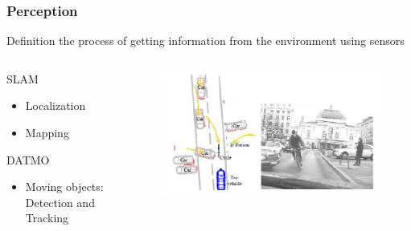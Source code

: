 \documentclass{beamer}
\begin{document}
	\begin{frame}
		\frametitle{Perception}
	
			\begin{block}{Definition}
				the process of getting information from the environment using sensors
			\end{block}	
	
		  \begin{columns}[t]
		  \begin{column}{4cm}
		  	\small
			\begin{exampleblock}{SLAM}		
		
			\begin{itemize}
			\item Localization
			\item Mapping
			\end{itemize}			
			
			\end{exampleblock}					
				
		\begin{exampleblock}{DATMO}		
			\begin{itemize}
			\item Moving objects: Detection and Tracking
			\end{itemize}			
		\end{exampleblock}	

		  \end{column}
		  
		  \begin{column}{6cm}
			\begin{figure}[h]
			\center
			\includegraphics[scale=0.3]{img/perception}
			\end{figure}	
		  \end{column}
		 \end{columns}		 	
			
	
	\end{frame}	
	
\end{document}
